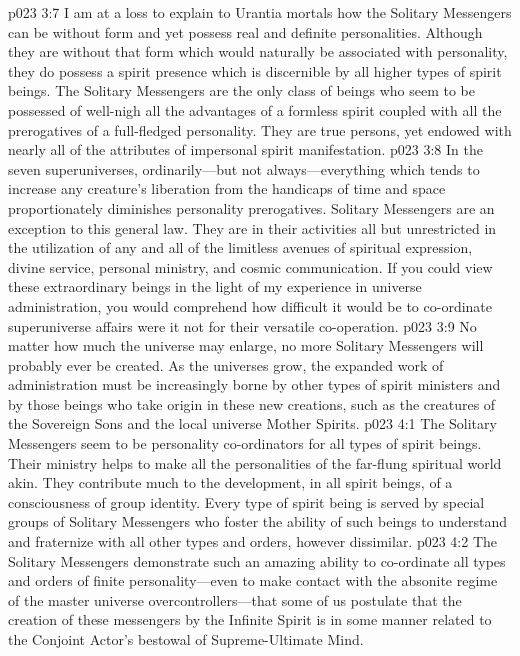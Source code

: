 \pc \vs p023 3:7 I am at a loss to explain to Urantia mortals how the Solitary Messengers can be without form and yet possess real and definite personalities. Although they are without that form which would naturally be associated with personality, they do possess a spirit presence which is discernible by all higher types of spirit beings. The Solitary Messengers are the only class of beings who seem to be possessed of well\hyp{}nigh all the advantages of a formless spirit coupled with all the prerogatives of a full\hyp{}fledged personality. They are true persons, yet endowed with nearly all of the attributes of impersonal spirit manifestation.
\vs p023 3:8 In the seven superuniverses, ordinarily---but not always---everything which tends to increase any creature’s liberation from the handicaps of time and space proportionately diminishes personality prerogatives. Solitary Messengers are an exception to this general law. They are in their activities all but unrestricted in the utilization of any and all of the limitless avenues of spiritual expression, divine service, personal ministry, and cosmic communication. If you could view these extraordinary beings in the light of my experience in universe administration, you would comprehend how difficult it would be to co\hyp{}ordinate superuniverse affairs were it not for their versatile co\hyp{}operation.
\vs p023 3:9 No matter how much the universe may enlarge, no more Solitary Messengers will probably ever be created. As the universes grow, the expanded work of administration must be increasingly borne by other types of spirit ministers and by those beings who take origin in these new creations, such as the creatures of the Sovereign Sons and the local universe Mother Spirits.
\vs p023 4:1 The Solitary Messengers seem to be personality co\hyp{}ordinators for all types of spirit beings. Their ministry helps to make all the personalities of the far\hyp{}flung spiritual world akin. They contribute much to the development, in all spirit beings, of a consciousness of group identity. Every type of spirit being is served by special groups of Solitary Messengers who foster the ability of such beings to understand and fraternize with all other types and orders, however dissimilar.
\vs p023 4:2 The Solitary Messengers demonstrate such an amazing ability to co\hyp{}ordinate all types and orders of finite personality---even to make contact with the absonite regime of the master universe overcontrollers---that some of us postulate that the creation of these messengers by the Infinite Spirit is in some manner related to the Conjoint Actor’s bestowal of Supreme\hyp{}Ultimate Mind.
